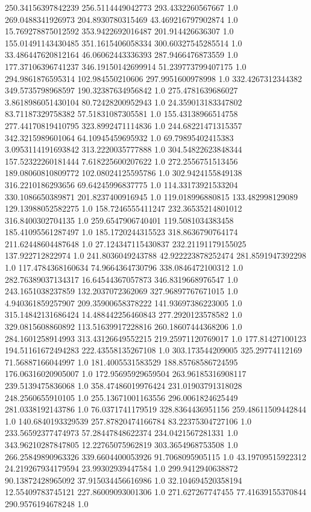 250.34156397842239	256.5114449042773	293.4332260567667	1.0
269.0488341926973	204.8930780315469	43.469216797902874	1.0
15.769278875012592	353.9422692016487	201.914426636307	1.0
155.01491143430485	351.1615406058334	300.60327545285514	1.0
33.486447620812164	46.06062443336393	287.9466476873559	1.0
177.37106396741237	346.19150142699914	51.239773799407175	1.0
294.9861876595314	102.984550210606	297.9951600978998	1.0
332.4267312344382	349.5735798968597	190.32387634956842	1.0
275.4781639686027	3.8618986051430104	80.72428200952943	1.0
24.359013183347802	83.71187329758382	57.51831087305581	1.0
155.43138966514758	277.44170819410795	323.8992471114836	1.0
244.68221471315357	342.3215989601064	64.10945459695932	1.0
69.79895402415383	3.0953114191693842	313.2220035777888	1.0
304.54822623848344	157.52322260181444	7.618225600207622	1.0
272.2556751513456	189.08060810809772	102.08024125595786	1.0
302.9424155849138	316.2210186293656	69.64245996837775	1.0
114.33173921533204	330.1086650389871	201.8237400916945	1.0
119.018996880815	133.482998129089	129.13988052582275	1.0
158.7246555411247	232.36535214801012	316.8400302704135	1.0
259.6547906740401	119.5081034383458	185.41095561287497	1.0
185.1720244315523	318.8636790764174	211.62448604487648	1.0
27.124347115430837	232.21191179155025	137.922712822974	1.0
241.8036049243788	42.922223878252474	281.8591947392298	1.0
117.4784368160634	74.9664364730796	338.0846472100312	1.0
282.76389037134317	16.64544367057873	346.8319668976547	1.0
243.1651038237859	132.2037072362069	327.96897767671015	1.0
4.940361859257907	209.35900658378222	141.93697386223005	1.0
315.14842131686424	14.488442256460843	277.2920123578582	1.0
329.0815608860892	113.51639917228816	260.18607444368206	1.0
284.1601258914993	313.43126649552215	219.25971120769017	1.0
177.81427100123	194.51161672494283	222.43558135267108	1.0
303.173544209005	325.29774112169	71.56887166044997	1.0
181.4005531583529	188.85768586724595	176.06316020905007	1.0
172.95695929659504	263.96185316908117	239.5139475836068	1.0
358.47486019976424	231.01903791318028	248.2560655910105	1.0
255.13671001163556	296.0061824625449	281.0338192143786	1.0
76.0371741179519	328.8364436951156	259.48611509442844	1.0
140.6840193329539	257.87820474166784	83.22375304727106	1.0
233.56592377474973	57.28447848622374	234.0421567281331	1.0
343.96210287847805	12.22765075962819	303.3654968753508	1.0
266.25849890963326	339.6604400053926	91.7068095905115	1.0
43.19709515922312	24.219267934179594	23.99302939447584	1.0
299.9412940638872	90.13872428965092	37.915034456616986	1.0
32.104694520358194	12.55409783745121	227.86009093001306	1.0
271.627267747455	77.41639155370844	290.9576194678248	1.0
